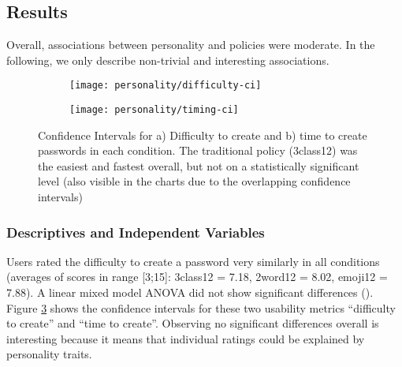 
\subsection{Results}
Overall, associations between personality and policies were moderate. In the following, we only describe non-trivial and interesting associations. 

\begin{figure}[htbp]
	\centering
	\begin{subfigure}[t]{0.49\linewidth}
		\texttt{[image: personality/difficulty-ci]}
		\caption{\label{fig:personality:study-1-difficulty-ci}}
	\end{subfigure}
	\begin{subfigure}[t]{0.49\linewidth}
		\texttt{[image: personality/timing-ci]}
		\caption{\label{fig:personality:study-1-timing-ci}}
	\end{subfigure}
	\caption{\label{fig:personality:study-1-usability-stats}Confidence Intervals for a) Difficulty to create and b) time to create passwords in each condition. The traditional policy (3class12) was the easiest and fastest overall, but not on a statistically significant level (also visible in the charts due to the overlapping confidence intervals)}
\end{figure}
\subsubsection{Descriptives and Independent Variables}
Users rated the difficulty to create a password very similarly in all conditions (averages of scores in range [3;15]: 3class12 = 7.18, 2word12 = 8.02, emoji12 = 7.88). A linear mixed model ANOVA did not show significant differences (). Figure \ref{fig:personality:study-1-usability-stats} shows the confidence intervals for these two usability metrics ``difficulty to create'' and ``time to create''. Observing no significant differences overall is interesting because it means that individual ratings could be explained by personality traits. %




